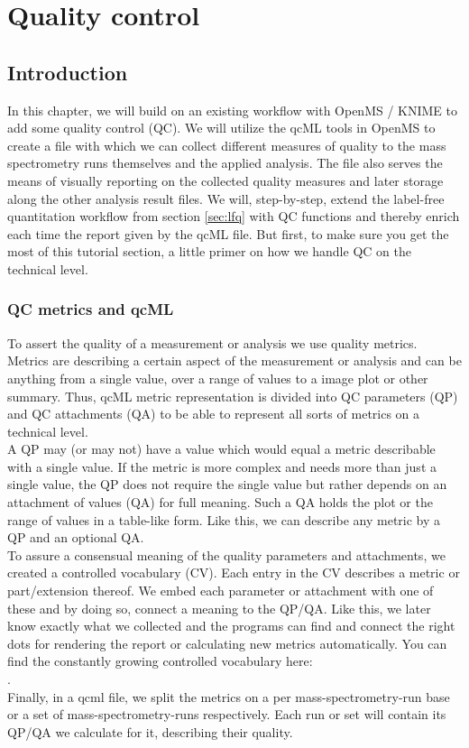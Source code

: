 
\newpage
\section{Quality control}
\label{sec:qc}

\subsection{Introduction}

In this chapter, we will build on an existing workflow with OpenMS / KNIME to add some quality control (QC). We will utilize the qcML tools in OpenMS to create a file with which we can collect different measures of quality to the mass spectrometry runs themselves and the applied analysis. The file also serves the means of visually reporting on the collected quality measures and later storage along the other analysis result files.
We will, step-by-step, extend the label-free quantitation workflow from section \ref{sec:lfq} with QC functions and thereby enrich each time the report given by the qcML file.
But first, to make sure you get the most of this tutorial section, a little primer on how we handle QC on the technical level. \\

\subsubsection*{QC metrics and qcML}
To assert the quality of a measurement or analysis we use quality metrics. Metrics are describing a certain aspect of the measurement or analysis and can be anything from a single value, over a range of values to a image plot or other summary. Thus, qcML metric representation is divided into QC parameters (QP) and QC attachments (QA) to be able to represent all sorts of metrics on a technical level.\\
A QP may (or may not) have a value which would equal a metric describable with a single value. If the metric is more complex and needs more than just a single value, the QP does not require the single value but rather depends on an attachment of values (QA) for full meaning. Such a QA holds the plot or the range of values in a table-like form. Like this, we can describe any metric by a QP and an optional QA.\\
To assure a consensual meaning of the quality parameters and attachments, we created a controlled vocabulary (CV). Each entry in the CV describes a metric or part/extension thereof. We embed each parameter or attachment with one of these and by doing so, connect a meaning to the QP/QA. Like this, we later know exactly what we collected and the programs can find and connect the right dots for rendering the report or calculating new metrics automatically. You can find the constantly growing controlled vocabulary here:\\ .\\
Finally, in a qcml file, we split the metrics on a per mass-spectrometry-run base or a set of mass-spectrometry-runs respectively. Each run or set will contain its QP/QA we calculate for it, describing their quality.


